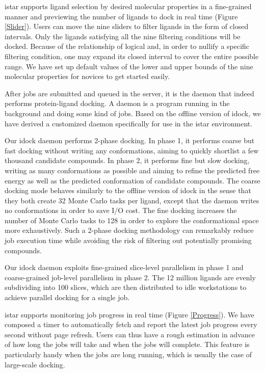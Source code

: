 \documentclass[10pt]{article}
\begin{document}
istar supports ligand selection by desired molecular properties in a fine-grained manner and previewing the number of ligands to dock in real time (Figure \ref{Slider}). Users can move the nine sliders to filter ligands in the form of closed intervals. Only the ligands satisfying all the nine filtering conditions will be docked. Because of the relationship of logical and, in order to nullify a specific filtering condition, one may expand its closed interval to cover the entire possible range. We have set up default values of the lower and upper bounds of the nine molecular properties for novices to get started easily.

After jobs are submitted and queued in the server, it is the daemon that indeed performs protein-ligand docking. A daemon is a program running in the background and doing some kind of jobs. Based on the offline version of idock, we have derived a customized daemon specifically for use in the istar environment.

Our idock daemon performs 2-phase docking. In phase 1, it performs coarse but fast docking without writing any conformations, aiming to quickly shortlist a few thousand candidate compounds. In phase 2, it performs fine but slow docking, writing as many conformations as possible and aiming to refine the predicted free energy as well as the predicted conformation of candidate compounds. The coarse docking mode behaves similarly to the offline version of idock in the sense that they both create 32 Monte Carlo tasks per ligand, except that the daemon writes no conformations in order to save I/O cost. The fine docking increases the number of Monte Carlo tasks to 128 in order to explore the conformational space more exhaustively. Such a 2-phase docking methodology can remarkably reduce job execution time while avoiding the risk of filtering out potentially promising compounds.

Our idock daemon exploits fine-grained slice-level parallelism in phase 1 and coarse-grained job-level parallelism in phase 2. The 12 million ligands are evenly subdividing into 100 slices, which are then distributed to idle workstations to achieve parallel docking for a single job.

istar supports monitoring job progress in real time (Figure \ref{Progress}). We have composed a timer to automatically fetch and report the latest job progress every second without page refresh. Users can thus have a rough estimation in advance of how long the jobs will take and when the jobs will complete. This feature is particularly handy when the jobs are long running, which is usually the case of large-scale docking.
\end{document}
